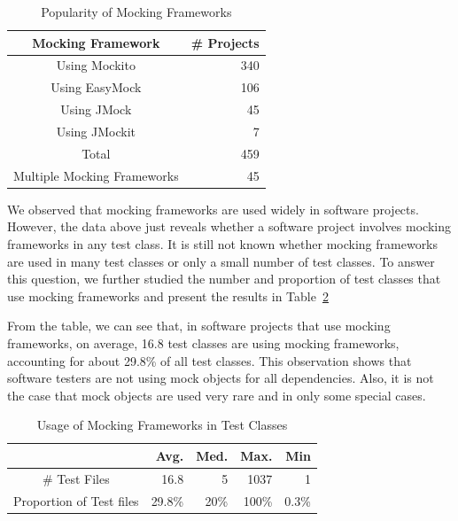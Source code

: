 \begin{table}
\caption{Popularity of Mocking Frameworks}
\vspace{-0.15cm}

\label{table:var}
\centering
\begin{tabular}{|c|r|}
\hline
 Mocking Framework & \# Projects\\
\hline
 Using Mockito & 340\\
 Using EasyMock & 106\\
 Using JMock & 45\\
 Using JMockit & 7\\
 Total & 459\\
 Multiple Mocking Frameworks & 45\\
\hline
\end{tabular}
\vspace{-0.15cm}

\end{table}

We observed that mocking frameworks are used widely in software projects. However, the data above just reveals whether a software project involves mocking frameworks in any test class. It is still not known whether mocking frameworks are used in many test classes or only  a small number of test classes. To answer this question, we further studied the number and proportion of test classes that use mocking frameworks and present the results in Table~\ref{table:testclass}

From the table, we can see that, in software projects that use mocking frameworks, on average, 16.8 test classes are using mocking frameworks, accounting for about 29.8\% of all test classes. This observation shows that software testers are not using mock objects for all dependencies. Also, it is not the case that mock objects are used very rare and in only some special cases. 

\begin{table}
\caption{Usage of Mocking Frameworks in Test Classes}
\vspace{-0.15cm}

\label{table:testclass}
\centering
\begin{tabular}{|c|r|r|r|r|}
\hline
 & Avg. & Med. & Max. & Min\\
\hline
\# Test Files &16.8&5&1037&1\\
Proportion of Test files &29.8\%&20\%&100\%&0.3\%\\
\hline
\end{tabular}
\vspace{-0.15cm}
\end{table}

